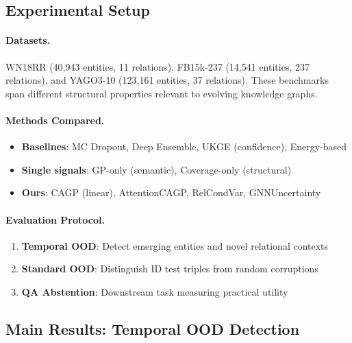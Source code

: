 
\subsection{Experimental Setup}

\paragraph{Datasets.}
WN18RR (40,943 entities, 11 relations), FB15k-237 (14,541 entities, 237 relations), and YAGO3-10 (123,161 entities, 37 relations).
These benchmarks span different structural properties relevant to evolving knowledge graphs.

\paragraph{Methods Compared.}
\begin{itemize}
    \item \textbf{Baselines}: MC Dropout, Deep Ensemble, UKGE (confidence), Energy-based
    \item \textbf{Single signals}: GP-only (semantic), Coverage-only (structural)
    \item \textbf{Ours}: CAGP (linear), AttentionCAGP, RelCondVar, GNNUncertainty
\end{itemize}

\paragraph{Evaluation Protocol.}
\begin{enumerate}
    \item \textbf{Temporal OOD}: Detect emerging entities and novel relational contexts
    \item \textbf{Standard OOD}: Distinguish ID test triples from random corruptions
    \item \textbf{QA Abstention}: Downstream task measuring practical utility
\end{enumerate}

\subsection{Main Results: Temporal OOD Detection}

